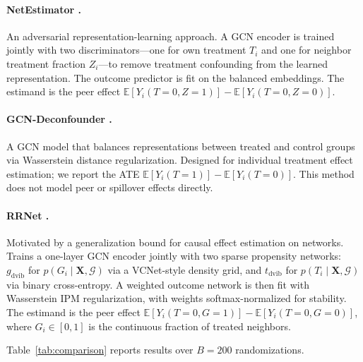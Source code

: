 \documentclass{article}
\theoremstyle{plain}
\theoremstyle{definition}
\theoremstyle{remark}
\begin{document}
\paragraph{NetEstimator \citep{jiang2022estimating}.}
An adversarial representation-learning approach. A GCN encoder is trained
jointly with two discriminators---one for own treatment $T_i$ and one for
neighbor treatment fraction $Z_i$---to remove treatment confounding from
the learned representation. The outcome predictor is fit on the balanced
embeddings. The estimand is the peer effect
$\mathbb{E}[Y_i(T{=}0, Z{=}1)] - \mathbb{E}[Y_i(T{=}0, Z{=}0)]$.

\paragraph{GCN-Deconfounder \citep{guo2020learning}.}
A GCN model that balances representations between treated and control groups
via Wasserstein distance regularization. Designed for individual treatment
effect estimation; we report the ATE
$\mathbb{E}[Y_i(T{=}1)] - \mathbb{E}[Y_i(T{=}0)]$.
This method does not model peer or spillover effects directly.

\paragraph{RRNet \citep{cai2023generalization}.}
Motivated by a generalization bound for causal effect estimation on networks.
Trains a one-layer GCN encoder jointly with two sparse propensity networks:
$g_{\mathrm{dvib}}$ for $p(G_i \mid \mathbf{X}, \mathcal{G})$ via a
VCNet-style density grid, and $t_{\mathrm{dvib}}$ for
$p(T_i \mid \mathbf{X}, \mathcal{G})$ via binary cross-entropy.
A weighted outcome network is then fit with Wasserstein IPM regularization,
with weights softmax-normalized for stability. The estimand is the peer effect
$\mathbb{E}[Y_i(T{=}0, G{=}1)] - \mathbb{E}[Y_i(T{=}0, G{=}0)]$,
where $G_i \in [0,1]$ is the continuous fraction of treated neighbors.



Table~\ref{tab:comparison} reports results over $B = 200$ randomizations.
\end{document}

